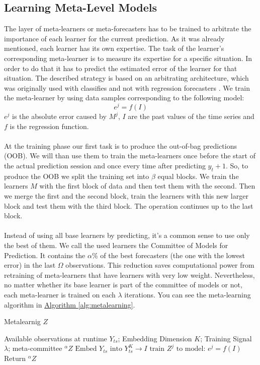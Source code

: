 \documentclass[runningheads,a4paper]{llncs}[2015/06/24]
\begin{document}
\subsection{Learning Meta-Level Models}
The layer of meta-learners or meta-forecasters has to be trained to arbitrate the importance of each learner for the current prediction. As it was already mentioned, each learner has its own expertise. The task of the learner's corresponding meta-learner is to measure its expertise for a specific situation. In order to do that it has to predict the estimated error of the learner for that situation. The  described strategy is based on an arbitrating architecture, which was originally used with classifies and not with regression forecasters \cite{ortega2001arbitrating}. We train the meta-learner by using data samples corresponding to the following model:\begin{equation}
e^j = f(I)
\end{equation} $e^j$ is the absolute error caused by $M^j$, $I$ are the past values of the time series and $f$ is the regression function.\\\\ At the training phase our first task is to produce the out-of-bag predictions (OOB). We will than use them to train the meta-learners once before the start of the actual prediction session and once every time after predicting $y_t+1$. So, to produce the OOB we split the training set into $\beta$ equal blocks. We train the learners $M$ with the first block of data and then test them with the second. Then we merge the first and the second block, train the learners with this new larger block and test them with the third block. The operation continues up to the last block.\\\\Instead of using all base learners by predicting, it's a common sense to use only the best of them. We call the used learners the Committee of Models for Prediction. It contains the $\alpha$\% of the best forecasters (the one with the lowest error) in the last $\Omega$ observations. This reduction saves computational power from retraining of meta-learners that have learners with very low weight. Nevertheless, no matter whether its base learner is part of the committee of models or not, each meta-learner is trained on each $\lambda$ iterations. You can see the meta-learning algorithm in \hyperref[alg:metalearning]{Algorithm  \ref{alg:metalearning}}.
    
\begin{algorithm}[h]

\caption{Metalearnig $Z$}\label{alg:metalearning}
\begin{algorithmic}[1]

\Require Available observations at runtime $Y_{ts}$; Embedding Dimension $K$; Training
Signal $\lambda$; meta-committee ${}^{\alpha}Z$
\State $\text{Embed $Y_{ts}$ into $Y_{ts}^{K}$} \rightarrow I$
\State $\text{train $Z^{j}$ to model: $e^{j} = f(I)$}$
\EndFor
\State $\text{Return ${}^{\alpha}Z$}$
\end{algorithmic}
\end{algorithm}
\end{document}
